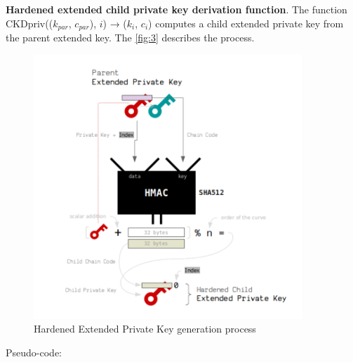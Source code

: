 \bigskip
{\textbf{Hardened extended child private key derivation function}}. The function CKDpriv(($k_{par}$, $c_{par}$), $i$) → ($k_i$, $c_i$) computes a child extended private key from the parent extended key.
The \autoref{fig:3} describes the process.

\begin{figure}[ht!]
    \centering
    \includegraphics[width=0.9\textwidth]{images/hard_private_gen.png}
    \caption[Hardened Extended Private Key generation process]{Hardened Extended Private Key generation process \cite{learnme}}
    \label{fig:3}
\end{figure}

Pseudo-code:

